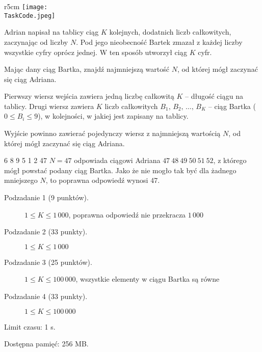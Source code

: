 \documentclass{boi2014-pl}
\renewcommand{\TaskCode}{sequence}
\begin{document}
    \begin{wrapfigure}[5]{r}{5cm}
        \vspace{-24pt}
		\texttt{[image: \\TaskCode.jpeg]}
	\end{wrapfigure}

    Adrian napisał na tablicy ciąg $K$ kolejnych, dodatnich liczb całkowitych, zaczynając od liczby $N$.
    Pod jego nieobecność Bartek zmazał z każdej liczby wszystkie cyfry oprócz jednej.
    W ten sposób utworzył ciąg $K$ cyfr.

    \Task

    Mając dany ciąg Bartka, znajdź najmniejszą wartość $N$, od której mógł zaczynać się ciąg Adriana.

    \Input

    Pierwszy wiersz wejścia zawiera jedną liczbę całkowitą $K$ -- długość ciągu na tablicy.
    Drugi wiersz zawiera $K$ liczb całkowitych $B_1,\, B_2 ,\, \ldots ,\, B_K$ -- ciąg Bartka ($0 \le B_i \le 9$), w kolejności, w jakiej jest zapisany na tablicy.
    
    \Output

    Wyjście powinno zawierać pojedynczy wiersz z najmniejszą wartością $N$, od której mógł zaczynać się ciąg Adriana.
    
    \Example

    \example
    {
        6 8 9 5 1 2
    }
    {
        47
    }
    {
        $N = 47$ odpowiada ciągowi Adriana $47\ 48\ 49\ 50\ 51\ 52$, z którego mógł powstać podany ciąg Bartka.
        Jako że nie mogło tak być dla żadnego mniejszego $N$, to poprawna odpowiedź wynosi 47.
    }

\Scoring

\begin{description}
    \item[Podzadanie 1 (9 punktów).] $1 \le K \le 1\,000$, poprawna odpowiedź nie przekracza $1\,000$
    \item[Podzadanie 2 (33 punkty).] $1 \le K \le 1\,000$
    \item[Podzadanie 3 (25 punktów).] $1 \le K \le 100\,000$, wszystkie elementy w ciągu Bartka są równe
    \item[Podzadanie 4 (33 punkty).] $1 \le K \le 100\,000$
\end{description}

\Constraints

Limit czasu: 1 s.

Dostępna pamięć: 256 MB.
\end{document}
